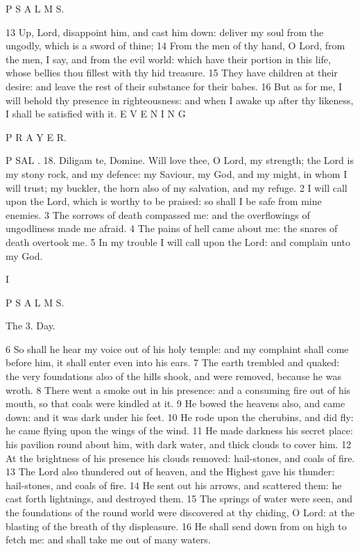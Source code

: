 P S A L M S.

13 Up, Lord, disappoint him, and cast him down: deliver my soul from the ungodly, which is a sword of thine; 14 From the men of thy hand, O Lord, from the men, I say, and from the evil world: which have their portion in this life, whose bellies thou fillest with thy hid treasure. 15 They have children at their desire: and leave the rest of their substance for their babes. 16 But as for me, I will behold thy presence in righteousness: and when I awake up after thy likeness, I shall be satisfied with it. E V E N I N G

P R A Y E R.

P SAL . 18. Diligam te, Domine. Will love thee, O Lord, my strength; the Lord is my stony rock, and my defence: my Saviour, my God, and my might, in whom I will trust; my buckler, the horn also of my salvation, and my refuge. 2 I will call upon the Lord, which is worthy to be praised: so shall I be safe from mine enemies. 3 The sorrows of death compassed me: and the overflowings of ungodliness made me afraid. 4 The pains of hell came about me: the snares of death overtook me. 5 In my trouble I will call upon the Lord: and complain unto my God.

I

P S A L M S.

The 3. Day.

6 So shall he hear my voice out of his holy temple: and my complaint shall come before him, it shall enter even into his ears. 7 The earth trembled and quaked: the very foundations also of the hills shook, and were removed, because he was wroth. 8 There went a smoke out in his presence: and a consuming fire out of his mouth, so that coals were kindled at it. 9 He bowed the heavens also, and came down: and it was dark under his feet. 10 He rode upon the cherubins, and did fly: he came flying upon the wings of the wind. 11 He made darkness his secret place: his pavilion round about him, with dark water, and thick clouds to cover him. 12 At the brightness of his presence his clouds removed: hail-stones, and coals of fire. 13 The Lord also thundered out of heaven, and the Highest gave his thunder: hail-stones, and coals of fire. 14 He sent out his arrows, and scattered them: he cast forth lightnings, and destroyed them. 15 The springs of water were seen, and the foundations of the round world were discovered at thy chiding, O Lord: at the blasting of the breath of thy displeasure. 16 He shall send down from on high to fetch me: and shall take me out of many waters.


